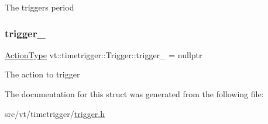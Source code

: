 The trigger\textquotesingle{}s period \mbox{\label{structvt_1_1timetrigger_1_1_trigger_ac1d93e6fff9b0faa8889198e481d50d4}} 
\subsubsection{\texorpdfstring{trigger\+\_\+}{trigger\_}}
{\footnotesize\ttfamily \hyperlink{namespacevt_ae0a5a7b18cc99d7b732cb4d44f46b0f3}{Action\+Type} vt\+::timetrigger\+::\+Trigger\+::trigger\+\_\+ = nullptr\hspace{0.3cm}{\ttfamily [private]}}

The action to trigger 

The documentation for this struct was generated from the following file\+:\begin{DoxyCompactItemize}
\item 
src/vt/timetrigger/\hyperlink{trigger_8h}{trigger.\+h}\end{DoxyCompactItemize}
